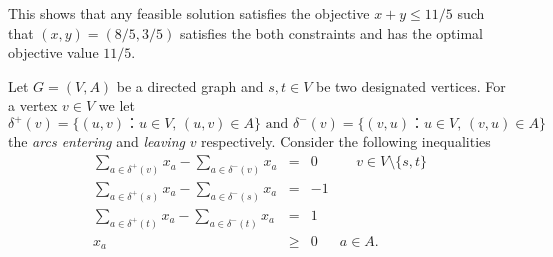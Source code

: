 \documentclass[11pt]{article}
\begin{document}
This shows that any feasible solution satisfies the objective $x + y \leq 11/5$ such that $(x, y)=(8/5 , 3/5)$ satisfies the both constraints and has the optimal objective value $11/5$. 



\newpage 
\problem

 Let $G = (V,A)$ be a directed graph and $s,t ∈ V$ be two designated vertices. For a vertex $v ∈ V$ we let
  \begin{displaymath}
    δ^+(v) = \{ (u,v) ： u ∈ V, \, (u,v) ∈A\} \text{ and } δ^-(v) = \{ (v,u) ： u ∈ V, \, (v,u) ∈A\}
  \end{displaymath}
  the \emph{arcs entering} and \emph{leaving} $v$ respectively.  Consider the following inequalities
  \begin{equation} 
    \begin{array}{rclc}      \displaystyle 
    ∑_{a ∈ δ^+(v) } x_a -  ∑_{a ∈ δ^-(v) } x_a & = &  0 & \, \quad v ∈ V \setminus \{s,t\} \\ \displaystyle 
      ∑_{a ∈ δ^+(s) } x_a -  ∑_{a ∈ δ^-(s) } x_a & = &  -1 & \\
      \displaystyle 
      ∑_{a ∈ δ^+(t) } x_a -  ∑_{a ∈ δ^-(t) } x_a & = &  1 & \\
      x_a &≥& 0 & a ∈A.
    \end{array}
    \label{eq:1}
  \end{equation}
  
\end{document}
